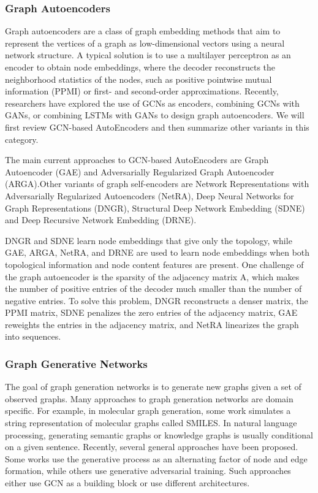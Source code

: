 \documentclass[11pt,en]{elegantpaper}
\begin{document}
\subsubsection{Graph Autoencoders}
Graph autoencoders are a class of graph embedding methods that aim to represent the vertices of a graph as low-dimensional vectors using a neural network structure. A typical solution is to use a multilayer perceptron as an encoder to obtain node embeddings, where the decoder reconstructs the neighborhood statistics of the nodes, such as positive pointwise mutual information (PPMI) or first- and second-order approximations. Recently, researchers have explored the use of GCNs as encoders, combining GCNs with GANs, or combining LSTMs with GANs to design graph autoencoders. We will first review GCN-based AutoEncoders and then summarize other variants in this category.

The main current approaches to GCN-based AutoEncoders are Graph Autoencoder (GAE) and Adversarially Regularized Graph Autoencoder (ARGA).Other variants of graph self-encoders are Network Representations with Adversarially Regularized Autoencoders (NetRA), Deep Neural Networks for Graph Representations (DNGR), Structural Deep Network Embedding (SDNE) and Deep Recursive Network Embedding (DRNE).

DNGR and SDNE learn node embeddings that give only the topology, while GAE, ARGA, NetRA, and DRNE are used to learn node embeddings when both topological information and node content features are present. One challenge of the graph autoencoder is the sparsity of the adjacency matrix A, which makes the number of positive entries of the decoder much smaller than the number of negative entries. To solve this problem, DNGR reconstructs a denser matrix, the PPMI matrix, SDNE penalizes the zero entries of the adjacency matrix, GAE reweights the entries in the adjacency matrix, and NetRA linearizes the graph into sequences.

\subsubsection{Graph Generative Networks}
The goal of graph generation networks is to generate new graphs given a set of observed graphs. Many approaches to graph generation networks are domain specific. For example, in molecular graph generation, some work simulates a string representation of molecular graphs called SMILES. In natural language processing, generating semantic graphs or knowledge graphs is usually conditional on a given sentence. Recently, several general approaches have been proposed. Some works use the generative process as an alternating factor of node and edge formation, while others use generative adversarial training. Such approaches either use GCN as a building block or use different architectures.
\end{document}
